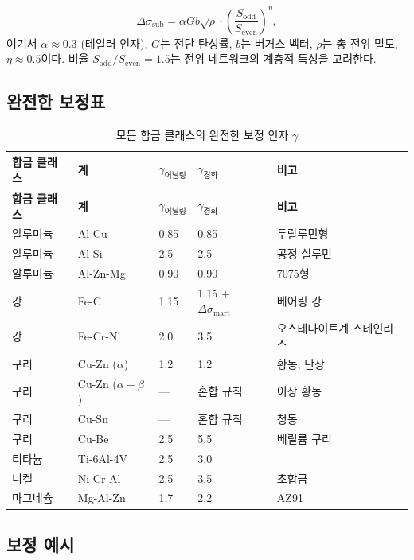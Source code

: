 \documentclass[12pt,a4paper]{article}
\begin{document}
	\[
	\Delta\sigma_{\text{sub}} = \alpha G b \sqrt{\rho} \cdot \left( \frac{S_{\text{odd}}}{S_{\text{even}}} \right)^{\eta},
	\]
	여기서 \(\alpha \approx 0.3\) (테일러 인자), \(G\)는 전단 탄성률, \(b\)는 버거스 벡터, \(\rho\)는 총 전위 밀도, \(\eta \approx 0.5\)이다. 비율 \(S_{\text{odd}}/S_{\text{even}}=1.5\)는 전위 네트워크의 계층적 특성을 고려한다.
	
	\subsection{완전한 보정표}
	\label{subsec:complete-calibration}
	
	\begin{longtable}{p{3cm}p{2.5cm}p{2.5cm}p{2.5cm}p{4cm}}
		\caption{모든 합금 클래스의 완전한 보정 인자 \(\gamma\)} \label{tab:complete-gamma} \\
		\toprule
		\textbf{합금 클래스} & \textbf{계} & \(\gamma_{\text{어닐링}}\) & \(\gamma_{\text{경화}}\) & \textbf{비고} \\
		\midrule
		\endfirsthead
		\toprule
		\textbf{합금 클래스} & \textbf{계} & \(\gamma_{\text{어닐링}}\) & \(\gamma_{\text{경화}}\) & \textbf{비고} \\
		\midrule
		\endhead
		알루미늄 & Al-Cu & 0.85 & 0.85 & 두랄루민형 \\
		알루미늄 & Al-Si & 2.5 & 2.5 & 공정 실루민 \\
		알루미늄 & Al-Zn-Mg & 0.90 & 0.90 & 7075형 \\
		강 & Fe-C & 1.15 & 1.15 + \(\Delta\sigma_{\text{mart}}\) & 베어링 강 \\
		강 & Fe-Cr-Ni & 2.0 & 3.5 & 오스테나이트계 스테인리스 \\
		구리 & Cu-Zn (\(\alpha\)) & 1.2 & 1.2 & 황동, 단상 \\
		구리 & Cu-Zn (\(\alpha+\beta\)) & — & 혼합 규칙 & 이상 황동 \\
		구리 & Cu-Sn & — & 혼합 규칙 & 청동 \\
		구리 & Cu-Be & 2.5 & 5.5 & 베릴륨 구리 \\
		티타늄 & Ti-6Al-4V & 2.5 & 3.0 & \\
		니켈 & Ni-Cr-Al & 2.5 & 3.5 & 초합금 \\
		마그네슘 & Mg-Al-Zn & 1.7 & 2.2 & AZ91 \\
		\bottomrule
	\end{longtable}
	
	\subsection{보정 예시}
	
\end{document}
